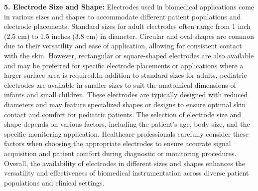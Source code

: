 \textbf{5. Electrode Size and Shape:}
       Electrodes used in biomedical applications come in various sizes and shapes to accommodate different patient populations and electrode placements. Standard sizes for adult electrodes often range from 1 inch (2.5 cm) to 1.5 inches (3.8 cm) in diameter. Circular and oval shapes are common due to their versatility and ease of application, allowing for consistent contact with the skin. However, rectangular or square-shaped electrodes are also available and may be preferred for specific electrode placements or applications where a larger surface area is required.In addition to standard sizes for adults, pediatric electrodes are available in smaller sizes to suit the anatomical dimensions of infants and small children. These electrodes are typically designed with reduced diameters and may feature specialized shapes or designs to ensure optimal skin contact and comfort for pediatric patients.
       The selection of electrode size and shape depends on various factors, including the patient's age, body size, and the specific monitoring application. Healthcare professionals carefully consider these factors when choosing the appropriate electrodes to ensure accurate signal acquisition and patient comfort during diagnostic or monitoring procedures. Overall, the availability of electrodes in different sizes and shapes enhances the versatility and effectiveness of biomedical instrumentation across diverse patient populations and clinical settings.

